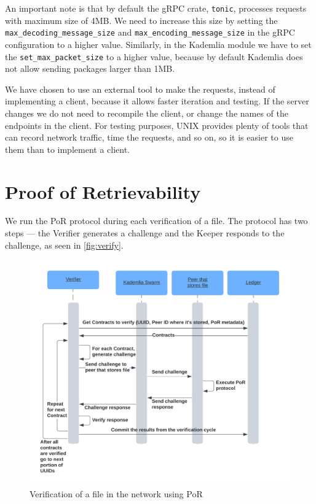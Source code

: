 An important note is that by default the gRPC crate, \texttt{tonic},
processes requests with maximum size of 4MB.
We need to increase this size by setting the \texttt{max\_decoding\_message\_size} and
\texttt{max\_encoding\_message\_size} in the gRPC configuration to a higher value.
Similarly, in the Kademlia module we have to set the \texttt{set\_max\_packet\_size}
to a higher value, because by default Kademlia does not allow sending packages larger than 1MB.

We have chosen to use an external tool to make the requests,
instead of implementing a client, because it allows faster iteration and testing.
If the server changes we do not need to recompile the client,
or change the names of the endpoints in the client.
For testing purposes, UNIX provides plenty of tools that can record network traffic,
time the requests, and so on, so it is easier to use them than to implement a client.

\section{Proof of Retrievability}

We run the PoR protocol during each verification of a file.
The protocol has two steps --- the Verifier generates a challenge and
the Keeper responds to the challenge, as seen in \autoref{fig:verify}.

\begin{figure}
    \centering
    \includegraphics[width=1\textwidth]{gfx/verify.png}
    \caption{Verification of a file in the network using PoR}
    \label{fig:verify}
\end{figure}

